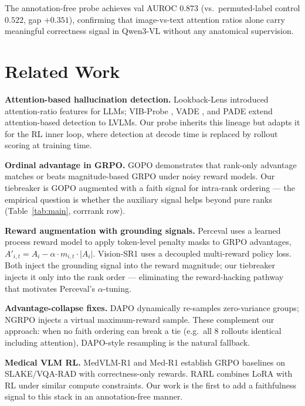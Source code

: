 \documentclass[11pt]{article}
\begin{document}
The annotation-free probe achieves val AUROC $0.873$ (vs.\
permuted-label control $0.522$, gap $+0.351$), confirming that
image-vs-text attention ratios alone carry meaningful correctness
signal in Qwen3-VL without any anatomical supervision.

\section{Related Work}

\textbf{Attention-based hallucination detection.} Lookback-Lens
\citep{lookback-lens} introduced attention-ratio features for LLMs;
VIB-Probe \citep{vibprobe}, VADE \citep{vade}, and PADE
\citep{pade} extend attention-based detection to LVLMs. Our probe
inherits this lineage but adapts it for the RL inner loop, where
detection at decode time is replaced by rollout scoring at training
time.

\textbf{Ordinal advantage in GRPO.} GOPO \citep{gopo} demonstrates that
rank-only advantage matches or beats magnitude-based GRPO under noisy
reward models. Our tiebreaker is GOPO augmented with a faith signal for
intra-rank ordering --- the empirical question is whether the auxiliary
signal helps beyond pure ranks (Table~\ref{tab:main}, corrrank row).

\textbf{Reward augmentation with grounding signals.} Perceval
\citep{perceval} uses a learned process reward model to apply token-level
penalty masks to GRPO advantages, $A'_{i,t} = A_i - \alpha \cdot
m_{i,t}\cdot|A_i|$. Vision-SR1 \citep{vision-sr1} uses a decoupled
multi-reward policy loss. Both inject the grounding signal into the
reward magnitude; our tiebreaker injects it only into the rank order ---
eliminating the reward-hacking pathway that motivates Perceval's
$\alpha$-tuning.

\textbf{Advantage-collapse fixes.} DAPO \citep{dapo} dynamically
re-samples zero-variance groups; NGRPO \citep{ngrpo} injects a virtual
maximum-reward sample. These complement our approach: when no faith
ordering can break a tie (e.g.\ all 8 rollouts identical including
attention), DAPO-style resampling is the natural fallback.

\textbf{Medical VLM RL.} MedVLM-R1 \citep{medvlm-r1} and Med-R1
\citep{med-r1} establish GRPO baselines on SLAKE/VQA-RAD with
correctness-only rewards. RARL \citep{rarl} combines LoRA with RL under
similar compute constraints. Our work is the first to add a faithfulness
signal to this stack in an annotation-free manner.
\end{document}
